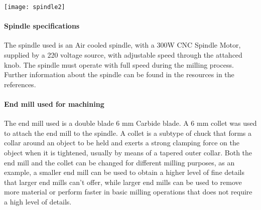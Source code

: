 \begin{center}
\texttt{[image: spindle2]}
\end{center}

\paragraph{Spindle specifications }
The spindle used is an Air cooled spindle, with a 300W CNC Spindle Motor, supplied by a 220 voltage source, with adjustable speed through the attahced knob. The spindle must operate with full speed during the milling process. Further information about the spindle can be found in the resources in the references. 

\paragraph{End mill used for machining}
The end mill used is a double blade 6 mm Carbide blade. A 6 mm collet was used to attach the end mill to the spindle. A collet is a subtype of chuck that forms a collar around an object to be held and exerts a strong clamping force on the object when it is tightened, usually by means of a tapered outer collar. Both the end mill and the collet can be changed for different milling purposes, as an example, a smaller end mill can be used to obtain a higher level of fine details that larger end mills can’t offer, while larger end mills can be used to remove more material or perform faster in basic milling operations that does not require a high level of details. 
